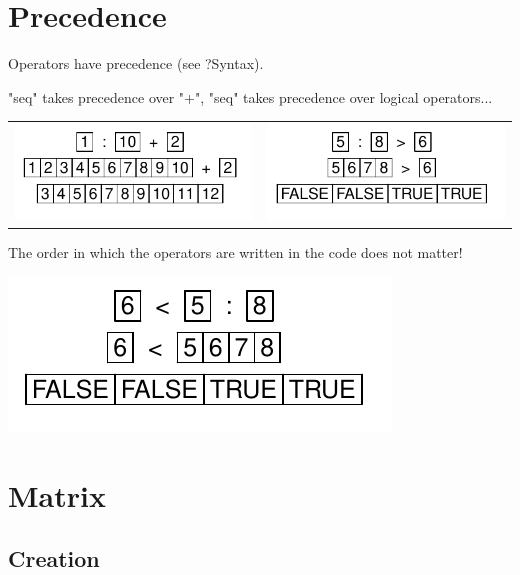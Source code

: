 \documentclass[pdflatex]{article}
\begin{document}
\section{Precedence}

Operators have precedence (see ?Syntax).

"seq" takes precedence over "+", "seq" takes precedence over logical operators...

\begin{tabular}{cc}
\includegraphics{precedence} & \includegraphics{operator_gt}\\
\end{tabular}

The order in which the operators are written in the code does not matter!

\includegraphics{operator_gt_inv}

\section{Matrix}

\subsection{Creation}
\end{document}
